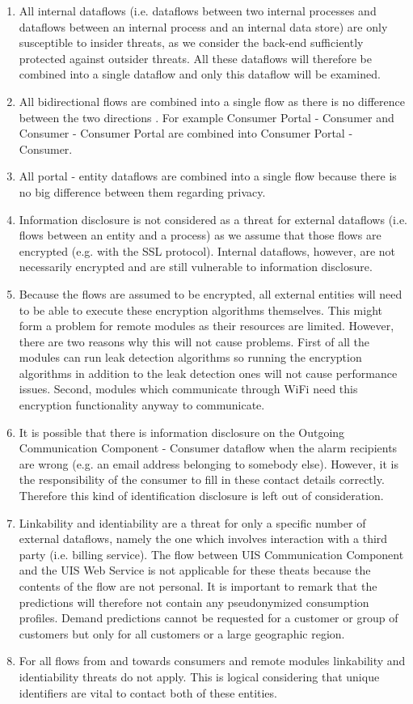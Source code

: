 \begin{enumerate}
  \item All internal dataflows (i.e. dataflows between two internal processes
  and dataflows between an internal process and an internal data store) are only
  susceptible to insider threats, as we consider the back-end sufficiently
  protected against outsider threats. All these dataflows will therefore be
  combined into a single dataflow and only this dataflow will be examined.
  \item All bidirectional flows are combined into a single flow as there is no
  difference between the two directions . For example Consumer Portal - Consumer
  and Consumer - Consumer Portal are combined into Consumer Portal - Consumer.
  \item All portal - entity dataflows are combined into a single flow because
  there is no big difference between them regarding privacy.
  \item Information disclosure is not considered as a threat for external
  dataflows (i.e. flows between an entity and a process) as we assume that
  those flows are encrypted (e.g. with the SSL protocol). Internal dataflows,
  however, are not necessarily encrypted and are still vulnerable to
  information disclosure.
  \item Because the flows are assumed to be encrypted, all external entities
  will need to be able to execute these encryption algorithms themselves. This
  might form a problem for remote modules as their resources are limited.
  However, there are two reasons why this will not cause problems. First of all
  the modules can run leak detection algorithms so running the encryption
  algorithms in addition to the leak detection ones will not cause performance
  issues. Second, modules which communicate through WiFi need this encryption
  functionality anyway to communicate.
  \item It is possible that there is information disclosure on the Outgoing
  Communication Component - Consumer dataflow when the alarm recipients are
  wrong (e.g. an email address belonging to somebody else). However, it is the
  responsibility of the consumer to fill in these contact details correctly.
  Therefore this kind of identification disclosure is left out of
  consideration.
  \item Linkability and identiability are a threat for only a specific
  number of external dataflows, namely the one which involves interaction with a
  third party (i.e. billing service). The flow between UIS Communication
  Component and the UIS Web Service is not applicable for these theats
  because the contents of the flow are not personal. It is important to remark
  that the predictions will therefore not contain any pseudonymized consumption
  profiles. Demand predictions cannot be requested for a customer or group of
  customers but only for all customers or a large geographic region.  
  \item For all flows from and towards consumers and remote modules linkability
  and identiability threats do not apply. This is logical considering that
  unique identifiers are vital to contact both of these entities.


\end{enumerate}
